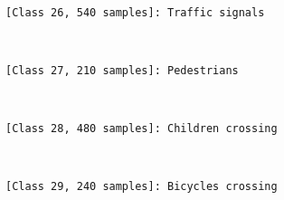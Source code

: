 \documentclass[11pt]{article}
\begin{document}
    \begin{center}
    \end{center}
    { \hspace*{\fill} \\}
    
    \begin{Verbatim}[commandchars=\\\{\}]
[Class 26, 540 samples]: Traffic signals

    \end{Verbatim}

    \begin{center}
    \end{center}
    { \hspace*{\fill} \\}
    
    \begin{Verbatim}[commandchars=\\\{\}]
[Class 27, 210 samples]: Pedestrians

    \end{Verbatim}

    \begin{center}
    \end{center}
    { \hspace*{\fill} \\}
    
    \begin{Verbatim}[commandchars=\\\{\}]
[Class 28, 480 samples]: Children crossing

    \end{Verbatim}

    \begin{center}
    \end{center}
    { \hspace*{\fill} \\}
    
    \begin{Verbatim}[commandchars=\\\{\}]
[Class 29, 240 samples]: Bicycles crossing

    \end{Verbatim}

    \begin{center}
    \end{center}
    { \hspace*{\fill} \\}
    
\end{document}
